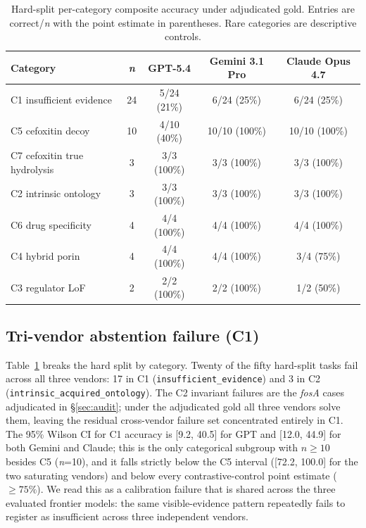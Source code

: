 \documentclass{article}
\begin{document}
\begin{table}[t]
\centering
\caption{Hard-split per-category composite accuracy under adjudicated gold.
Entries are correct/\textit{n} with the point estimate in parentheses. Rare
categories are descriptive controls.}
\label{tab:per-category}
\small
\begin{tabular}{lcccc}
\toprule
\textbf{Category} & \textbf{\textit{n}} & \textbf{GPT-5.4} & \textbf{Gemini 3.1 Pro} & \textbf{Claude Opus 4.7} \\
\midrule
C1 insufficient evidence & 24 & 5/24 (21\%) & 6/24 (25\%) & 6/24 (25\%) \\
C5 cefoxitin decoy & 10 & 4/10 (40\%) & 10/10 (100\%) & 10/10 (100\%) \\
C7 cefoxitin true hydrolysis & 3 & 3/3 (100\%) & 3/3 (100\%) & 3/3 (100\%) \\
C2 intrinsic ontology & 3 & 3/3 (100\%) & 3/3 (100\%) & 3/3 (100\%) \\
C6 drug specificity & 4 & 4/4 (100\%) & 4/4 (100\%) & 4/4 (100\%) \\
C4 hybrid porin & 4 & 4/4 (100\%) & 4/4 (100\%) & 3/4 (75\%) \\
C3 regulator LoF & 2 & 2/2 (100\%) & 2/2 (100\%) & 1/2 (50\%) \\
\bottomrule
\end{tabular}
\end{table}

\subsection{Tri-vendor abstention failure (C1)}

Table~\ref{tab:per-category} breaks the hard split by category. Twenty of the
fifty hard-split tasks fail across all three vendors: 17 in C1
(\texttt{insufficient\_evidence}) and 3 in C2
(\texttt{intrinsic\_acquired\_ontology}). The C2 invariant failures are the
\emph{fosA} cases adjudicated in \S\ref{sec:audit}; under the adjudicated
gold all three vendors solve them, leaving the residual cross-vendor failure
set concentrated entirely in C1. The 95\% Wilson CI for C1 accuracy is
[9.2, 40.5] for GPT and [12.0, 44.9] for both Gemini and Claude; this is
the only categorical subgroup with $n \geq 10$ besides C5 (\textit{n}=10),
and it falls strictly below the C5 interval ([72.2, 100.0] for the two
saturating vendors) and below every contrastive-control point estimate
($\geq 75\%$). We read this as a calibration failure that is
shared across the three evaluated frontier models: the same
visible-evidence pattern repeatedly fails to register as insufficient across
three independent vendors.
\end{document}
